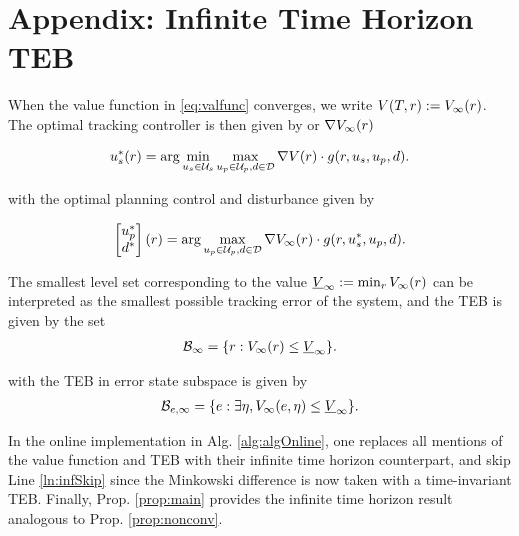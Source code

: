 \section*{Appendix: Infinite Time Horizon TEB}

When the value function in \eqref{eq:valfunc} converges, we write $V(T, r) := V_\infty(r)$.
The optimal tracking controller is then given by
or $\nabla V_\infty(r)$

\begin{align} \label{eq:opt_ctrl_inf}
\tctrl^*(\rstate) = \arg\min_{\tctrl\in\tcset} \max_{\pctrl\in\pcset, \dstb\in\dset} \nabla\valfunc(\rstate) \cdot \rdyn(\rstate,\tctrl,\pctrl,\dstb). 
\end{align}

\noindent with the optimal planning control and disturbance given by 

\begin{align} \label{eq:opt_dstb_inf}
\begin{bmatrix}
\pctrl^* \\
\dstb^*
\end{bmatrix}(\rstate) = \arg \max_{\pctrl\in\pcset, \dstb\in\dset} \nabla\valfunc_\infty(\rstate) \cdot \rdyn(\rstate,\tctrl^*,\pctrl,\dstb). 
\end{align}

The smallest level set corresponding to the value $\underline{V}_\infty := \min_{r} V_\infty(r)$ can be interpreted as the smallest possible tracking error of the system, and
the TEB is given by the set 
\begin{align} \label{eq:TEB_inf}
\TEB_\infty = \{\rstate: \valfunc_\infty(\rstate) \le \underline\valfunc_\infty\}.
\end{align}

\noindent with the TEB in error state subspace is given by 
  \begin{align}  \label{eq:TEBp_inf}
  \TEB_{\estate, \infty} = \{\estate: \exists \astate, \valfunc_\infty(\estate, \astate) \le \underline\valfunc_\infty\}. 
  \end{align}

In the online implementation in Alg. \ref{alg:algOnline}, one replaces all mentions of the value function and TEB with their infinite time horizon counterpart, and skip Line \ref{ln:infSkip} since the Minkowski difference is now taken with a time-invariant TEB.
Finally, Prop. \ref{prop:main} provides the infinite time horizon result analogous to Prop. \ref{prop:nonconv}.

